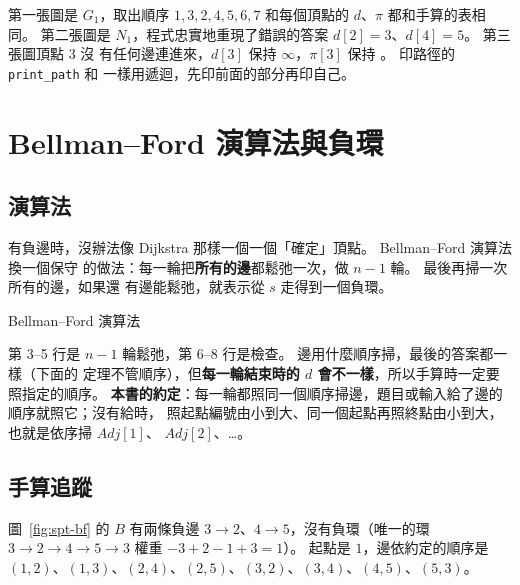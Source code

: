 第一張圖是 $G_1$，取出順序 $1, 3, 2, 4, 5, 6, 7$ 和每個頂點的 $d$、$\pi$ 都和手算的表相同。
第二張圖是 $N_1$，程式忠實地重現了錯誤的答案 $d[2] = 3$、$d[4] = 5$。 第三張圖頂點 $3$ 沒
有任何邊連進來，$d[3]$ 保持 $\infty$，$\pi[3]$ 保持 \NIL。 印路徑的 \texttt{print\_path} 和
 一樣用遞迴，先印前面的部分再印自己。

\section{Bellman--Ford 演算法與負環}
\label{sec:spt-bf}

\subsection{演算法}

有負邊時，沒辦法像 Dijkstra 那樣一個一個「確定」頂點。 Bellman--Ford 演算法換一個保守
的做法：每一輪把\textbf{所有的邊}都鬆弛一次，做 $n - 1$ 輪。 最後再掃一次所有的邊，如果還
有邊能鬆弛，就表示從 $s$ 走得到一個負環。

\begin{pseudo}[label=alg:spt-bf]{Bellman--Ford 演算法}
    \State {}
         
            \State {}
        \EndFor
    \EndFor
            \State \Return \FALSE {}
        \EndIf
    \EndFor
    \State \Return \TRUE
\EndFunction
\end{pseudo}

第 3--5 行是 $n - 1$ 輪鬆弛，第 6--8 行是檢查。 邊用什麼順序掃，最後的答案都一樣（下面的
定理不管順序），但\textbf{每一輪結束時的 $d$ 會不一樣}，所以手算時一定要照指定的順序。
\textbf{本書的約定}：每一輪都照同一個順序掃邊，題目或輸入給了邊的順序就照它；沒有給時，
照起點編號由小到大、同一個起點再照終點由小到大，也就是依序掃 $\mathit{Adj}[1]$、
$\mathit{Adj}[2]$、\ldots。

\subsection{手算追蹤}
\label{sec:spt-bf-trace}

圖~\ref{fig:spt-bf} 的 $B$ 有兩條負邊 $3 \to 2$、$4 \to 5$，沒有負環（唯一的環
$3 \to 2 \to 4 \to 5 \to 3$ 權重 $-3 + 2 - 1 + 3 = 1$）。 起點是 $1$，邊依約定的順序是
$(1, 2)$、$(1, 3)$、$(2, 4)$、$(2, 5)$、$(3, 2)$、$(3, 4)$、$(4, 5)$、$(5, 3)$。

